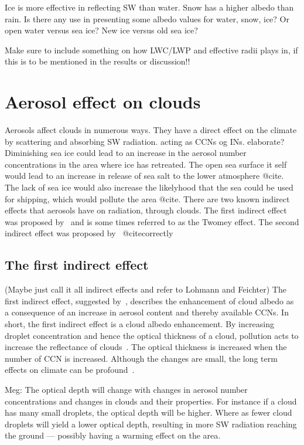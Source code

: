 Ice is more effective in reflecting SW than water. Snow has a higher albedo than rain. Is there any use in presenting some albedo values for water, snow, ice? Or open water versus sea ice? New ice versus old sea ice?

Make sure to include something on how LWC/LWP and effective radii plays in, if this is to be mentioned in the results or discussion!!

\section{Aerosol effect on clouds}
Aerosols affect clouds in numerous ways. They have a direct effect on the climate by scattering and absorbing SW radiation. acting as CCNs og INs. elaborate?
Diminishing sea ice could lead to an increase in the aerosol number concentrations in the area where ice has retreated. The open sea surface it self would lead to an increase in release of sea salt to the lower atmosphere @cite. The lack of sea ice would also increase the likelyhood that the sea could be used for shipping, which would pollute the area @cite. There are two known indirect effects that aerosols have on radiation, through clouds. The first indirect effect was proposed by~\cite{Twomey1974} and is some times referred to as the Twomey effect. The second indirect effect was proposed by~\cite{Albrecht1989} @citecorrectly 

\subsection{The first indirect effect} (Maybe just call it all indirect effects and refer to Lohmann and Feichter)
The first indirect effect, suggested by~\cite{Twomey1974}, describes the enhancement of cloud albedo as a consequence of an increase in aerosol content and thereby available CCNs.
In short, the first indirect effect is a cloud albedo enhancement.
By increasing droplet concentration and hence the optical thickness of a cloud, pollution acts to increase the reflectance of clouds~\citep{Twomey1977}. 
The optical thickness is increased when the number of CCN is increased. Although the changes are small, the long term effects on climate can be profound~\citep{Twomey1974}.

Meg: The optical depth will change with changes in aerosol number concentrations and changes in clouds and their properties. For instance if a cloud has many small droplets, the optical depth will be higher. Where as  fewer cloud droplets will yield a lower optical depth, resulting in more SW radiation reaching the ground — possibly having a warming effect on the area. 


